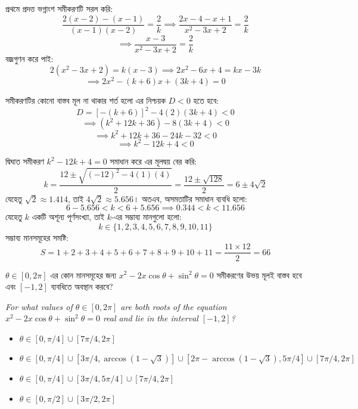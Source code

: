 \documentclass[12pt, a4paper]{article}
\begin{document}
\begin{tcolorbox}[solutionbox={সমাধান (Solution)}]
    \noindent
    প্রথমে প্রদত্ত ভগ্নাংশ সমীকরণটি সরল করি:
    \[ \frac{2(x-2) - (x-1)}{(x-1)(x-2)} = \frac{2}{k} \implies \frac{2x - 4 - x + 1}{x^2 - 3x + 2} = \frac{2}{k} \]
    \[ \implies \frac{x-3}{x^2 - 3x + 2} = \frac{2}{k} \]
    বজ্রগুণন করে পাই:
    \[ 2(x^2 - 3x + 2) = k(x-3) \implies 2x^2 - 6x + 4 = kx - 3k \]
    \[ \implies 2x^2 - (k+6)x + (3k+4) = 0 \]
    
    \vspace{0.5em}
    সমীকরণটির কোনো বাস্তব মূল না থাকার শর্ত হলো এর নিশ্চয়ক $D < 0$ হতে হবে:
    \[ D = [-(k+6)]^2 - 4(2)(3k+4) < 0 \]
    \[ \implies (k^2 + 12k + 36) - 8(3k+4) < 0 \]
    \[ \implies k^2 + 12k + 36 - 24k - 32 < 0 \]
    \[ \implies k^2 - 12k + 4 < 0 \]
    
    \vspace{0.5em}
    দ্বিঘাত সমীকরণ $k^2 - 12k + 4 = 0$ সমাধান করে এর মূলদ্বয় বের করি:
    \[ k = \frac{12 \pm \sqrt{(-12)^2 - 4(1)(4)}}{2} = \frac{12 \pm \sqrt{128}}{2} = 6 \pm 4\sqrt{2} \]
    যেহেতু $\sqrt{2} \approx 1.414$, তাই $4\sqrt{2} \approx 5.656$। 
    অতএব, অসমতাটির সমাধান ব্যবধি হলো:
    \[ 6 - 5.656 < k < 6 + 5.656 \implies 0.344 < k < 11.656 \]
    যেহেতু $k$ একটি অশূন্য পূর্ণসংখ্যা, তাই $k$-এর সম্ভাব্য মানগুলো হলো:
    \[ k \in \{1, 2, 3, 4, 5, 6, 7, 8, 9, 10, 11\} \]
    সম্ভাব্য মানসমূহের সমষ্টি:
    \[ S = 1 + 2 + 3 + 4 + 5 + 6 + 7 + 8 + 9 + 10 + 11 = \frac{11 \times 12}{2} = 66 \]
\end{tcolorbox}
\begin{tcolorbox}[questionbox={প্রশ্ন (Question) 42}]
    \noindent
    $\theta \in [0, 2\pi]$ এর কোন মানসমূহের জন্য $x^2 - 2x\cos\theta + \sin^2\theta = 0$ সমীকরণের উভয় মূলই বাস্তব হবে এবং $[-1, 2]$ ব্যবধিতে অবস্থান করবে?
    
    \vspace{0.8em}
    \begin{english}
    \noindent\textit{\color{darkgray}
    For what values of $\theta \in [0, 2\pi]$ are both roots of the equation $x^2 - 2x\cos\theta + \sin^2\theta = 0$ real and lie in the interval $[-1, 2]$?
    }
    \end{english}
\end{tcolorbox}

\begin{itemize}[label={}, leftmargin=1cm, itemsep=0.5em]
    \item[\textbf{A)}] $\theta \in [0, \pi/4] \cup [7\pi/4, 2\pi]$
    \item[\textbf{B)}] $\theta \in [0, \pi/4] \cup [3\pi/4, \arccos(1-\sqrt{3})] \cup [2\pi-\arccos(1-\sqrt{3}), 5\pi/4] \cup [7\pi/4, 2\pi]$
    \item[\textbf{C)}] $\theta \in [0, \pi/4] \cup [3\pi/4, 5\pi/4] \cup [7\pi/4, 2\pi]$
    \item[\textbf{D)}] $\theta \in [0, \pi/2] \cup [3\pi/2, 2\pi]$
\end{itemize}
\end{document}
